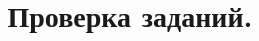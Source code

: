 \documentclass[a4paper,final, 14pt]{extarticle}
\title{Проверка заданий.}
\author{Буленок В.Г. \and }
\begin{document}
\date{}

\tableofcontents
\end{document}

